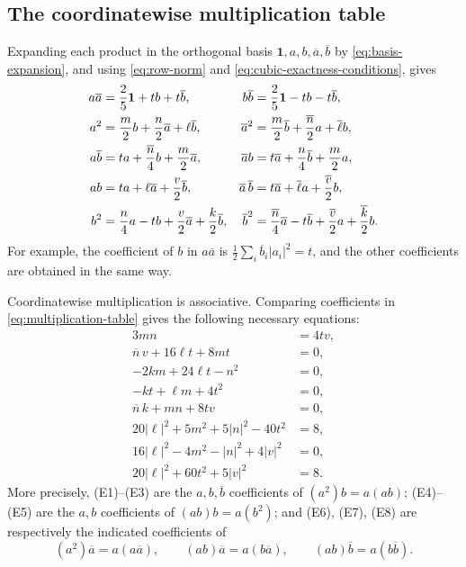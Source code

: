 \documentclass[11pt,reqno]{amsart}
\theoremstyle{remark}
\newcommand{\one}{\mathbf 1}
\newcommand{\abs}[1]{\left\lvert #1\right\rvert}
\begin{document}
\subsection{The coordinatewise multiplication table}

Expanding each product in the orthogonal basis
$\one,a,b,\overline a,\overline b$ by \eqref{eq:basis-expansion}, and using
\eqref{eq:row-norm} and \eqref{eq:cubic-exactness-conditions}, gives
\begin{align}
a\overline a&=\frac25\one+tb+t\overline b,
&b\overline b&=\frac25\one-tb-t\overline b,\notag\\
a^2&=\frac m2b+\frac n2\overline a+\ell\overline b,
&\overline a^2&=\frac m2\overline b+\frac{\overline n}{2}a+\overline\ell b,
\notag\\
a\overline b&=ta+\frac{\overline n}{4}b+\frac m2\overline a,
&\overline a b&=t\overline a+\frac n4\overline b+\frac m2a,
\notag\\
ab&=ta+\ell\overline a+\frac v2\overline b,
&\overline a\,\overline b&=t\overline a+\overline\ell a
 +\frac{\overline v}{2}b,
\notag\\
b^2&=\frac n4a-tb+\frac v2\overline a+\frac k2\overline b,
&\overline b^2&=\frac{\overline n}{4}\overline a-t\overline b
 +\frac{\overline v}{2}a+\frac{\overline k}{2}b.
\label{eq:multiplication-table}
\end{align}
For example, the coefficient of $b$ in $a\overline a$ is
$\frac12\sum_i\overline b_i\abs{a_i}^2=t$, and the other coefficients are
obtained in the same way.

Coordinatewise multiplication is associative.  Comparing coefficients in
\eqref{eq:multiplication-table} gives the following necessary equations:
\begin{align}
3mn&=4tv,\tag{E1}\label{eq:E1}\\
\overline n\,v+16\ell t+8mt&=0,\tag{E2}\label{eq:E2}\\
-2km+24\ell t-n^2&=0,\tag{E3}\label{eq:E3}\\
-kt+\ell m+4t^2&=0,\tag{E4}\label{eq:E4}\\
\overline n\,k+mn+8tv&=0,\tag{E5}\label{eq:E5}\\
20\abs\ell^2+5m^2+5\abs n^2-40t^2&=8,\tag{E6}\label{eq:E6}\\
16\abs\ell^2-4m^2-\abs n^2+4\abs v^2&=0,\tag{E7}\label{eq:E7}\\
20\abs\ell^2+60t^2+5\abs v^2&=8.\tag{E8}\label{eq:E8}
\end{align}
More precisely, (E1)--(E3) are the $a,b,\overline b$ coefficients of
$(a^2)b=a(ab)$; (E4)--(E5) are the $a,b$ coefficients of
$(ab)b=a(b^2)$; and (E6), (E7), (E8) are respectively the indicated
coefficients of
\[
(a^2)\overline a=a(a\overline a),\qquad
(ab)\overline a=a(b\overline a),\qquad
(ab)\overline b=a(b\overline b).
\]
\end{document}
